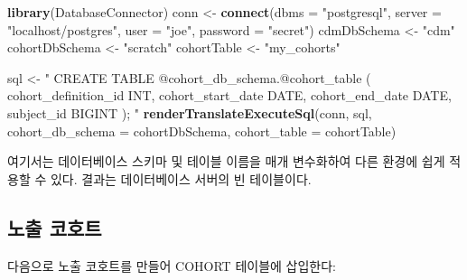 \documentclass[11pt]{book}
\newenvironment{Shaded}{\begin{snugshade}}{\end{snugshade}}
\newcommand{\KeywordTok}[1]{\textcolor[rgb]{0.13,0.29,0.53}{\textbf{#1}}}
\newcommand{\DataTypeTok}[1]{\textcolor[rgb]{0.13,0.29,0.53}{#1}}
\newcommand{\StringTok}[1]{\textcolor[rgb]{0.31,0.60,0.02}{#1}}
\newcommand{\NormalTok}[1]{#1}
\theoremstyle{definition}
\theoremstyle{definition}
\theoremstyle{definition}
\theoremstyle{remark}
\begin{document}
\begin{Shaded}
\begin{Highlighting}[]
\KeywordTok{library}\NormalTok{(DatabaseConnector)}
\NormalTok{conn <-}\StringTok{ }\KeywordTok{connect}\NormalTok{(}\DataTypeTok{dbms =} \StringTok{"postgresql"}\NormalTok{,}
                \DataTypeTok{server =} \StringTok{"localhost/postgres"}\NormalTok{,}
                \DataTypeTok{user =} \StringTok{"joe"}\NormalTok{,}
                \DataTypeTok{password =} \StringTok{"secret"}\NormalTok{)}
\NormalTok{cdmDbSchema <-}\StringTok{ "cdm"}
\NormalTok{cohortDbSchema <-}\StringTok{ "scratch"}
\NormalTok{cohortTable <-}\StringTok{ "my_cohorts"}

\NormalTok{sql <-}\StringTok{ "}
\StringTok{CREATE TABLE @cohort_db_schema.@cohort_table (}
\StringTok{  cohort_definition_id INT,}
\StringTok{  cohort_start_date DATE,}
\StringTok{  cohort_end_date DATE,}
\StringTok{  subject_id BIGINT}
\StringTok{);}
\StringTok{"}
\KeywordTok{renderTranslateExecuteSql}\NormalTok{(conn, sql,}
                          \DataTypeTok{cohort_db_schema =}\NormalTok{ cohortDbSchema,}
                          \DataTypeTok{cohort_table =}\NormalTok{ cohortTable)}
\end{Highlighting}
\end{Shaded}

여기서는 데이터베이스 스키마 및 테이블 이름을 매개 변수화하여 다른
환경에 쉽게 적용할 수 있다. 결과는 데이터베이스 서버의 빈 테이블이다.

\subsection{노출 코호트}\label{-}

다음으로 노출 코호트를 만들어 COHORT 테이블에 삽입한다:
\end{document}
